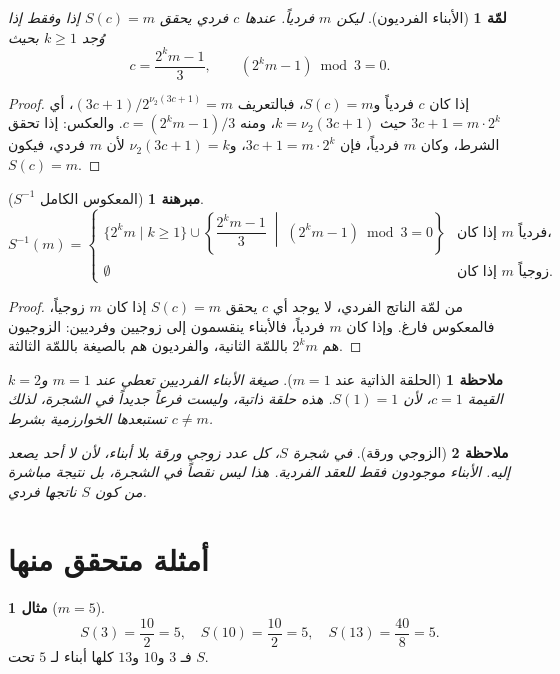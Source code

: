 \documentclass[12pt,a4paper]{article}
\theoremstyle{definition}
\newtheorem{example}{مثال}[section]
\theoremstyle{plain}
\newtheorem{lemma}{لمّة}[section]
\newtheorem{theorem}{مبرهنة}[section]
\newtheorem{remark}{ملاحظة}[section]
\newcommand{\nuTwo}{\nu_2}
\newcommand{\compS}{S}
\begin{document}
\begin{lemma}[الأبناء الفرديون]
ليكن $m$ فردياً. عندها $c$ فردي يحقق $\compS(c)=m$ إذا وفقط إذا وُجد $k \geq 1$ بحيث
\[
c = \frac{2^k m - 1}{3}, \qquad (2^k m - 1) \bmod 3 = 0.
\]
\end{lemma}
\begin{proof}
إذا كان $c$ فردياً و$\compS(c)=m$، فبالتعريف $(3c+1)/2^{\nuTwo(3c+1)}=m$،
أي $3c+1 = m \cdot 2^k$ حيث $k=\nuTwo(3c+1)$، ومنه $c=(2^k m-1)/3$.
والعكس: إذا تحقق الشرط، وكان $m$ فردياً، فإن $3c+1=m\cdot 2^k$،
و$\nuTwo(3c+1)=k$ لأن $m$ فردي، فيكون $\compS(c)=m$.
\end{proof}

\begin{theorem}[المعكوس الكامل $S^{-1}$]
\[
\compS^{-1}(m) =
\begin{cases}
\{2^k m \mid k \geq 1\} \cup
\left\{\dfrac{2^k m -1}{3} \;\middle|\; (2^k m -1)\bmod 3 = 0\right\}
& \text{إذا كان $m$ فردياً،} \\[10pt]
\emptyset & \text{إذا كان $m$ زوجياً.}
\end{cases}
\]
\end{theorem}
\begin{proof}
من لمّة الناتج الفردي، لا يوجد أي $c$ يحقق $\compS(c)=m$ إذا كان $m$ زوجياً،
فالمعكوس فارغ.
وإذا كان $m$ فردياً، فالأبناء ينقسمون إلى زوجيين وفرديين:
الزوجيون هم $2^k m$ باللمّة الثانية، والفرديون هم بالصيغة باللمّة الثالثة.
\end{proof}

\begin{remark}[الحلقة الذاتية عند $m=1$]
صيغة الأبناء الفرديين تعطي عند $m=1$ و$k=2$ القيمة $c=1$، لأن $\compS(1)=1$.
هذه حلقة ذاتية، وليست فرعاً جديداً في الشجرة، لذلك تستبعدها الخوارزمية بشرط $c \ne m$.
\end{remark}

\begin{remark}[الزوجي ورقة]
في شجرة $S$، كل عدد زوجي ورقة بلا أبناء، لأن لا أحد يصعد إليه.
الأبناء موجودون فقط للعقد الفردية.
هذا ليس نقصاً في الشجرة، بل نتيجة مباشرة من كون $S$ ناتجها فردي.
\end{remark}

\section{أمثلة متحقق منها}

\begin{example}[$m=5$]
\[
\compS(3)=\frac{10}{2}=5, \quad
\compS(10)=\frac{10}{2}=5, \quad
\compS(13)=\frac{40}{8}=5.
\]
فـ $3$ و$10$ و$13$ كلها أبناء لـ $5$ تحت $S$.
\end{example}
\end{document}
